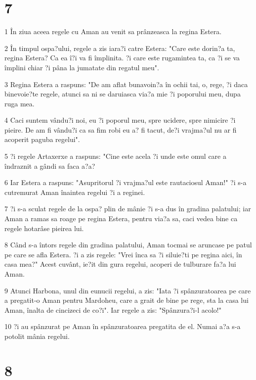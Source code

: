 \chapter{7}

\par 1 În ziua aceea regele cu Aman au venit sa prânzeasca la regina Estera.
\par 2 În timpul ospa?ului, regele a zis iara?i catre Estera: "Care este dorin?a ta, regina Estera? Ca ea î?i va fi împlinita. ?i care este rugamintea ta, ca ?i se va împlini chiar ?i pâna la jumatate din regatul meu".
\par 3 Regina Estera a raspuns: "De am aflat bunavoin?a în ochii tai, o, rege, ?i daca binevoie?te regele, atunci sa ni se daruiasca via?a mie ?i poporului meu, dupa ruga mea.
\par 4 Caci suntem vându?i noi, eu ?i poporul meu, spre ucidere, spre nimicire ?i pieire. De am fi vându?i ca sa fim robi eu a? fi tacut, de?i vrajma?ul nu ar fi acoperit paguba regelui".
\par 5 ?i regele Artaxerxe a raspuns: "Cine este acela ?i unde este omul care a îndraznit a gândi sa faca a?a?
\par 6 Iar Estera a raspuns: "Asupritorul ?i vrajma?ul este rautaciosul Aman!" ?i s-a cutremurat Aman înaintea regelui ?i a reginei.
\par 7 ?i s-a sculat regele de la ospa? plin de mânie ?i s-a dus în gradina palatului; iar Aman a ramas sa roage pe regina Estera, pentru via?a sa, caci vedea bine ca regele hotarâse pieirea lui.
\par 8 Când s-a întors regele din gradina palatului, Aman tocmai se aruncase pe patul pe care se afla Estera. ?i a zis regele: "Vrei înca sa ?i siluie?ti pe regina aici, în casa mea?" Acest cuvânt, ie?it din gura regelui, acoperi de tulburare fa?a lui Aman.
\par 9 Atunci Harbona, unul din eunucii regelui, a zis: "Iata ?i spânzuratoarea pe care a pregatit-o Aman pentru Mardoheu, care a grait de bine pe rege, sta la casa lui Aman, înalta de cincizeci de co?i". Iar regele a zis: "Spânzura?i-l acolo!"
\par 10 ?i au spânzurat pe Aman în spânzuratoarea pregatita de el. Numai a?a s-a potolit mânia regelui.

\chapter{8}

